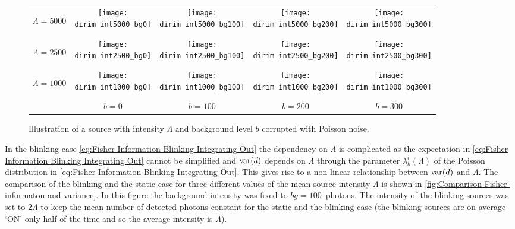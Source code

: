 \begin{figure}[!hbt]
	\centering
	\newcommand{\wf}{.2\textwidth}
	\newcommand{\dirim}{\qd gFREM/images/psf/}
	\newcommand{\vs}{.5}
	\begin{tabular}{|ccccc}
		\begin{sideways}\hspace{\vs cm}$\Lambda=5000$\end{sideways}
		&\texttt{[image: \\dirim int5000\_bg0]}
		&\texttt{[image: \\dirim int5000\_bg100]}
		&\texttt{[image: \\dirim int5000\_bg200]}
		&\texttt{[image: \\dirim int5000\_bg300]}\\
		\begin{sideways}\hspace{\vs cm}$\Lambda=2500$\end{sideways}
		&\texttt{[image: \\dirim int2500\_bg0]}
		&\texttt{[image: \\dirim int2500\_bg100]}
		&\texttt{[image: \\dirim int2500\_bg200]}
		&\texttt{[image: \\dirim int2500\_bg300]}\\
		\begin{sideways}\hspace{\vs cm}$\Lambda=1000$\end{sideways}
		&\texttt{[image: \\dirim int1000\_bg0]}
		&\texttt{[image: \\dirim int1000\_bg100]}
		&\texttt{[image: \\dirim int1000\_bg200]}
		&\texttt{[image: \\dirim int1000\_bg300]}\\
		&$b=0$ & $b=100$ & $b=200$ & $b=300$\\
		\hline	
	\end{tabular}
	\caption{Illustration of a source with intensity $\Lambda$ and background level $b$ corrupted with Poisson noise.}
	\label{fig:PSF int bg}
\end{figure}

In the blinking case \autoref{eq:Fisher Information Blinking Integrating Out} the dependency on $\Lambda$ is complicated as the expectation in \autoref{eq:Fisher Information Blinking Integrating Out} cannot be simplified and $\mathrm{var}(d)$ depends on $\Lambda$ through the parameter $\lambda_k^i(\Lambda)$ of the Poisson distribution in \autoref{eq:Fisher Information Blinking Integrating Out}. This gives rise to a non-linear relationship between $\mathrm{var}(d)$ and $\Lambda$.
%
The comparison of the blinking and the static case for three different values of the mean source intensity $\Lambda$ is shown in \autoref{fig:Comparison Fisher-informaton and variance}\aaa. In this figure the background intensity was fixed to $bg=100$~photons. The intensity of the blinking sources was set to $2\Lambda$ to keep the mean number of detected photons constant for the static and the blinking case (the blinking sources are on average `ON' only half of the time and so the average intensity is $\Lambda$). 

